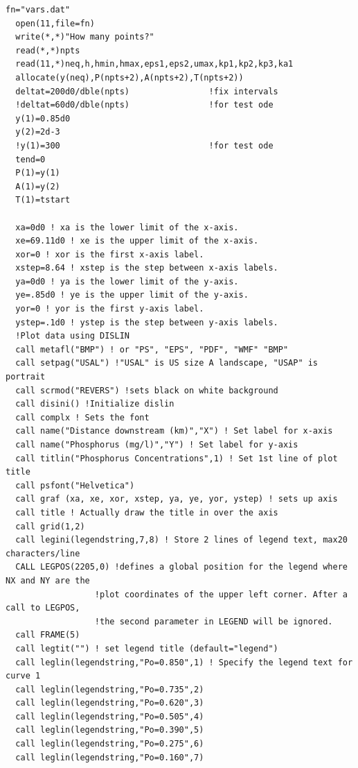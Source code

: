 \documentclass[titlepage,11pt]{article}
\begin{document}
\begin{singlespacing}
\begin{small}
\begin{Verbatim}[frame=single]
  fn="vars.dat"
  open(11,file=fn)
  write(*,*)"How many points?"
  read(*,*)npts
  read(11,*)neq,h,hmin,hmax,eps1,eps2,umax,kp1,kp2,kp3,ka1
  allocate(y(neq),P(npts+2),A(npts+2),T(npts+2))
  deltat=200d0/dble(npts)                !fix intervals
  !deltat=60d0/dble(npts)                !for test ode
  y(1)=0.85d0
  y(2)=2d-3
  !y(1)=300                              !for test ode
  tend=0
  P(1)=y(1)
  A(1)=y(2)
  T(1)=tstart

  xa=0d0 ! xa is the lower limit of the x-axis.
  xe=69.11d0 ! xe is the upper limit of the x-axis.
  xor=0 ! xor is the first x-axis label.
  xstep=8.64 ! xstep is the step between x-axis labels.
  ya=0d0 ! ya is the lower limit of the y-axis.
  ye=.85d0 ! ye is the upper limit of the y-axis.
  yor=0 ! yor is the first y-axis label.
  ystep=.1d0 ! ystep is the step between y-axis labels.
  !Plot data using DISLIN
  call metafl("BMP") ! or "PS", "EPS", "PDF", "WMF" "BMP"
  call setpag("USAL") !"USAL" is US size A landscape, "USAP" is portrait
  call scrmod("REVERS") !sets black on white background
  call disini() !Initialize dislin
  call complx ! Sets the font
  call name("Distance downstream (km)","X") ! Set label for x-axis
  call name("Phosphorus (mg/l)","Y") ! Set label for y-axis
  call titlin("Phosphorus Concentrations",1) ! Set 1st line of plot title
  call psfont("Helvetica")
  call graf (xa, xe, xor, xstep, ya, ye, yor, ystep) ! sets up axis
  call title ! Actually draw the title in over the axis
  call grid(1,2)
  call legini(legendstring,7,8) ! Store 2 lines of legend text, max20 characters/line
  CALL LEGPOS(2205,0) !defines a global position for the legend where NX and NY are the
                  !plot coordinates of the upper left corner. After a call to LEGPOS,
                  !the second parameter in LEGEND will be ignored.
  call FRAME(5)
  call legtit("") ! set legend title (default="legend")
  call leglin(legendstring,"Po=0.850",1) ! Specify the legend text for curve 1
  call leglin(legendstring,"Po=0.735",2)
  call leglin(legendstring,"Po=0.620",3)
  call leglin(legendstring,"Po=0.505",4)
  call leglin(legendstring,"Po=0.390",5)
  call leglin(legendstring,"Po=0.275",6)
  call leglin(legendstring,"Po=0.160",7)


\end{Verbatim}
\end{small}
\end{singlespacing}
\end{document}
